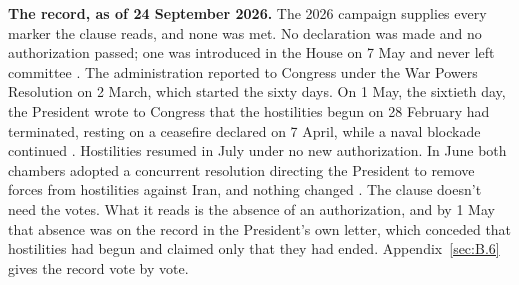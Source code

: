 \begin{esbox}
\textbf{The record, as of 24 September 2026.} The 2026 campaign supplies every marker the clause reads, and none was met. No declaration was made and no authorization passed; one was introduced in the House on 7 May and never left committee \autocite{hjres176}. The administration reported to Congress under the War Powers Resolution on 2 March, which started the sixty days. On 1 May, the sixtieth day, the President wrote to Congress that the hostilities begun on 28 February had terminated, resting on a ceasefire declared on 7 April, while a naval blockade continued \autocite{cbs2026terminated,lawfare2026sixtydays}. Hostilities resumed in July under no new authorization. In June both chambers adopted a concurrent resolution directing the President to remove forces from hostilities against Iran, and nothing changed \autocite{hconres86,asil2026iranwpr}. The clause doesn't need the votes. What it reads is the absence of an authorization, and by 1 May that absence was on the record in the President's own letter, which conceded that hostilities had begun and claimed only that they had ended. Appendix~\ref{sec:B.6} gives the record vote by vote.
\end{esbox}
